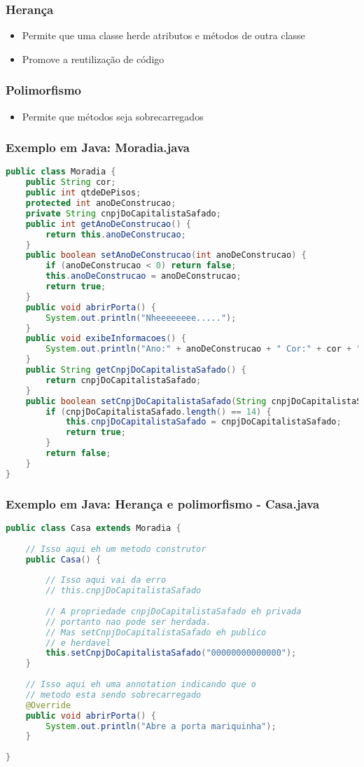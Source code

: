 \begin{frame}
	\frametitle{Herança}
	\begin{itemize}
		\item Permite que uma classe herde atributos e métodos de outra classe
		\item Promove a reutilização de código
	\end{itemize}
\end{frame}

\begin{frame}
	\frametitle{Polimorfismo}
	\begin{itemize}
		\item Permite que métodos seja sobrecarregados
	\end{itemize}
\end{frame}

\begin{frame}[fragile]
	\frametitle{Exemplo em Java: Moradia.java}
	\begin{lstlisting}[language=java]
public class Moradia {
	public String cor;
	public int qtdeDePisos;
	protected int anoDeConstrucao;
	private String cnpjDoCapitalistaSafado;
	public int getAnoDeConstrucao() {
		return this.anoDeConstrucao;
	}
	public boolean setAnoDeConstrucao(int anoDeConstrucao) {
		if (anoDeConstrucao < 0) return false;
		this.anoDeConstrucao = anoDeConstrucao;
		return true;
	}
	public void abrirPorta() {
		System.out.println("Nheeeeeeee.....");
	}
	public void exibeInformacoes() {
		System.out.println("Ano:" + anoDeConstrucao + " Cor:" + cor + " Pisos:" + qtdeDePisos + " Cnpj: " + this.cnpjDoCapitalistaSafado);
	}
	public String getCnpjDoCapitalistaSafado() {
		return cnpjDoCapitalistaSafado;
	}
	public boolean setCnpjDoCapitalistaSafado(String cnpjDoCapitalistaSafado) {
		if (cnpjDoCapitalistaSafado.length() == 14) {
			this.cnpjDoCapitalistaSafado = cnpjDoCapitalistaSafado;
			return true;
		}
		return false;
	}
}
	\end{lstlisting}
\end{frame}

\begin{frame}[fragile]
	\frametitle{Exemplo em Java: Herança e polimorfismo - Casa.java}
	\begin{lstlisting}[language=java]
public class Casa extends Moradia {
	
	// Isso aqui eh um metodo construtor
	public Casa() {
		
		// Isso aqui vai da erro
		// this.cnpjDoCapitalistaSafado
		
		// A propriedade cnpjDoCapitalistaSafado eh privada 
		// portanto nao pode ser herdada. 
		// Mas setCnpjDoCapitalistaSafado eh publico
		// e herdavel
		this.setCnpjDoCapitalistaSafado("00000000000000");
	}
	
	// Isso aqui eh uma annotation indicando que o 
	// metodo esta sendo sobrecarregado
	@Override
	public void abrirPorta() {
		System.out.println("Abre a porta mariquinha");
	}
	
}
	\end{lstlisting}
\end{frame}

